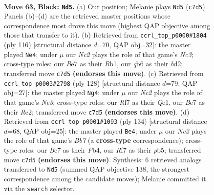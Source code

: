 \documentclass[11pt]{article}
\begin{document}
\clearpage

\begin{figure}[p]\centering
\begin{subfigure}{0.46\textwidth}\centering
\resizebox{\linewidth}{!}{%
\newchessgame
\chessboard[
  setfen={8/2nqbrk1/1Q6/P1p2p1p/3p1Pp1/8/1R1BP2P/3N2K1 b - - 2 63},
  showmover=false,
  pgfstyle=straightmove, color=movearrow, markmove={c7-d5}
]}
\caption{}
\end{subfigure}\hfill
\begin{subfigure}{0.46\textwidth}\centering
\resizebox{\linewidth}{!}{%
\newchessgame
\chessboard[
  setfen={8/r4p1k/1p3Pp1/1P2P3/2Q5/q1N3pP/3b2P1/1R3K2 w - - 5 59},
  showmover=false,
  pgfstyle=straightmove, color=movearrow, markmove={c3-e4}
]}
\caption{}
\end{subfigure}
\\[4pt]
\begin{subfigure}{0.46\textwidth}\centering
\resizebox{\linewidth}{!}{%
\newchessgame
\chessboard[
  setfen={3r1r2/6pk/7p/R1p1b3/3qp3/4N2P/4RPP1/4Q1K1 w - - 2 65},
  showmover=false,
  pgfstyle=straightmove, color=movearrow, markmove={e3-g4}
]}
\caption{}
\end{subfigure}\hfill
\begin{subfigure}{0.46\textwidth}\centering
\resizebox{\linewidth}{!}{%
\newchessgame
\chessboard[
  setfen={6k1/1Brq1pp1/5b1p/1p3P1P/1P6/P3RQPK/8/8 w - - 29 68},
  showmover=false,
  pgfstyle=straightmove, color=movearrow, markmove={b7-e4}
]}
\caption{}
\end{subfigure}
\caption{\textbf{Move 63, Black: \texttt{Nd5}.} (a) Our position; Melanie plays \texttt{Nd5} (\texttt{c7d5}). Panels (b)--(d) are the retrieved master positions whose correspondence most drove this move (highest QAP objective among those that transfer to it). (b) Retrieved from \texttt{ccrl\_top\_p0000\#1804} (ply 116) [structural distance $d$=70, QAP obj=32]: the master played \texttt{Ne4}; under $\mu$ our \emph{Nc2} plays the role of that game's \emph{Nc3}; cross-type roles: our \emph{B}e7 as their \emph{R}b1, our \emph{q}b6 as their \emph{b}d2; transferred move \texttt{c7d5} \textbf{(endorses this move)}. (c) Retrieved from \texttt{ccrl\_top\_p0003\#2798} (ply 128) [structural distance $d$=79, QAP obj=27]: the master played \texttt{Ng4}; under $\mu$ our \emph{Nc2} plays the role of that game's \emph{Ne3}; cross-type roles: our \emph{R}f7 as their \emph{Q}e1, our \emph{B}e7 as their \emph{R}e2; transferred move \texttt{c7d5} \textbf{(endorses this move)}. (d) Retrieved from \texttt{ccrl\_top\_p0001\#1093} (ply 134) [structural distance $d$=68, QAP obj=25]: the master played \texttt{Be4}; under $\mu$ our \emph{Nc2} plays the role of that game's \emph{Bb7} (a \textbf{cross-type} correspondence); cross-type roles: our \emph{B}e7 as their \emph{P}b4, our \emph{R}f7 as their \emph{p}b5; transferred move \texttt{c7d5} \textbf{(endorses this move)}. Synthesis: 6 retrieved analogs transferred to \texttt{Nd5} (summed QAP objective 138, the strongest correspondence among the candidate moves); Melanie committed it via the \texttt{search} selector.}
\label{fig:thought-m125}
\end{figure}
\end{document}
